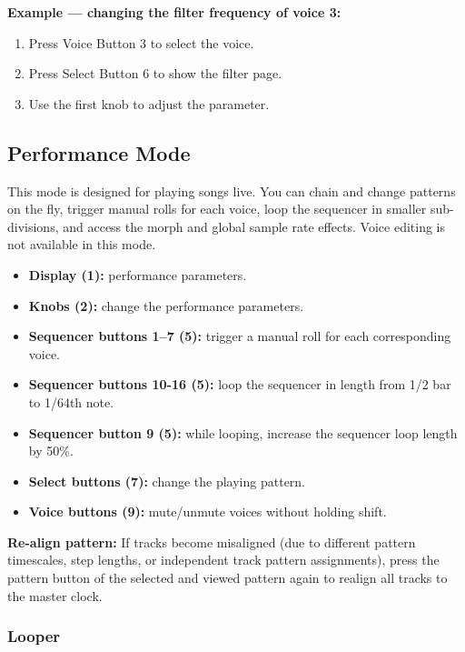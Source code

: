 \textbf{Example --- changing the filter frequency of voice 3:}

\begin{enumerate}
\def\labelenumi{\arabic{enumi}.}
\tightlist
\item
  Press Voice Button 3 to select the voice.
\item
  Press Select Button 6 to show the filter page.
\item
  Use the first knob to adjust the  parameter.
\end{enumerate}

\subsection{Performance Mode}\label{performance-mode}

This mode is designed for playing songs live. You can chain and change
patterns on the fly, trigger manual rolls for each voice, loop the
sequencer in smaller sub-divisions, and access the morph and global
sample rate effects. Voice editing is not available in this mode.

\begin{itemize}
\tightlist
\item
  \textbf{Display (1):} performance parameters.
\item
  \textbf{Knobs (2):} change the performance parameters.
\item
  \textbf{Sequencer buttons 1--7 (5):} trigger a manual roll for each
  corresponding voice.
\item
  \textbf{Sequencer buttons 10-16 (5):} loop the sequencer in length
  from 1/2 bar to 1/64th note.
\item
  \textbf{Sequencer button 9 (5):} while looping, increase the sequencer
  loop length by 50\%.
\item
  \textbf{Select buttons (7):} change the playing pattern.
\item
  \textbf{Voice buttons (9):} mute/unmute voices without holding shift.
\end{itemize}

\textbf{Re-align pattern:} If tracks become misaligned (due to different
pattern timescales, step lengths, or independent track pattern
assignments), press the pattern button of the selected and viewed
pattern again to realign all tracks to the master clock.

\subsubsection{Looper}\label{looper}

